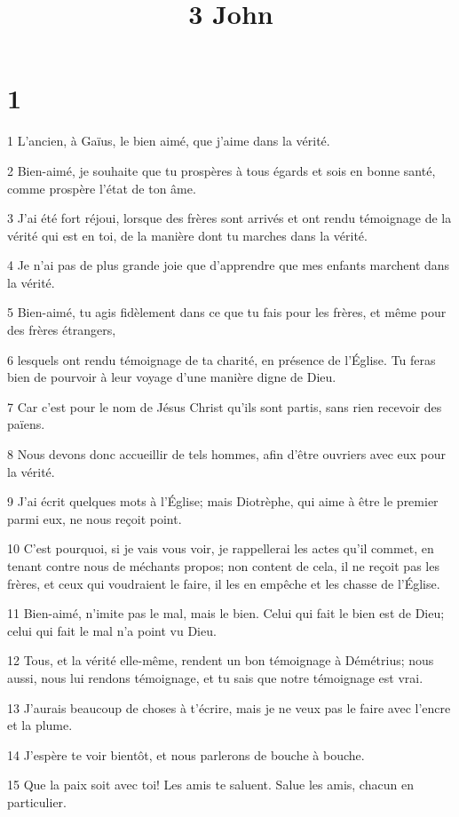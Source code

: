 

\title{3 John}


\chapter{1}

\par 1 L'ancien, à Gaïus, le bien aimé, que j'aime dans la vérité.
\par 2 Bien-aimé, je souhaite que tu prospères à tous égards et sois en bonne santé, comme prospère l'état de ton âme.
\par 3 J'ai été fort réjoui, lorsque des frères sont arrivés et ont rendu témoignage de la vérité qui est en toi, de la manière dont tu marches dans la vérité.
\par 4 Je n'ai pas de plus grande joie que d'apprendre que mes enfants marchent dans la vérité.
\par 5 Bien-aimé, tu agis fidèlement dans ce que tu fais pour les frères, et même pour des frères étrangers,
\par 6 lesquels ont rendu témoignage de ta charité, en présence de l'Église. Tu feras bien de pourvoir à leur voyage d'une manière digne de Dieu.
\par 7 Car c'est pour le nom de Jésus Christ qu'ils sont partis, sans rien recevoir des païens.
\par 8 Nous devons donc accueillir de tels hommes, afin d'être ouvriers avec eux pour la vérité.
\par 9 J'ai écrit quelques mots à l'Église; mais Diotrèphe, qui aime à être le premier parmi eux, ne nous reçoit point.
\par 10 C'est pourquoi, si je vais vous voir, je rappellerai les actes qu'il commet, en tenant contre nous de méchants propos; non content de cela, il ne reçoit pas les frères, et ceux qui voudraient le faire, il les en empêche et les chasse de l'Église.
\par 11 Bien-aimé, n'imite pas le mal, mais le bien. Celui qui fait le bien est de Dieu; celui qui fait le mal n'a point vu Dieu.
\par 12 Tous, et la vérité elle-même, rendent un bon témoignage à Démétrius; nous aussi, nous lui rendons témoignage, et tu sais que notre témoignage est vrai.
\par 13 J'aurais beaucoup de choses à t'écrire, mais je ne veux pas le faire avec l'encre et la plume.
\par 14 J'espère te voir bientôt, et nous parlerons de bouche à bouche.
\par 15 Que la paix soit avec toi! Les amis te saluent. Salue les amis, chacun en particulier.


